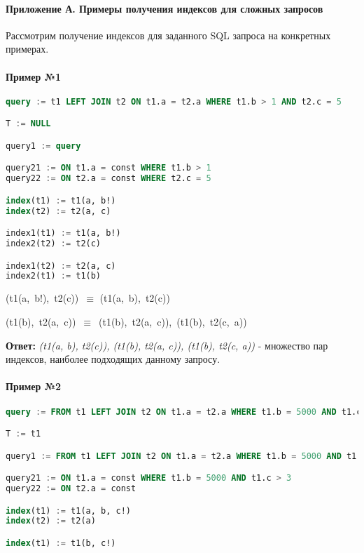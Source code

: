 \paragraph{Приложение А. Примеры получения индексов для сложных запросов}

Рассмотрим получение индексов для заданного SQL запроса на конкретных примерах.

\paragraph{Пример №1}

\begin{lstlisting}[language=SQL]
query := t1 LEFT JOIN t2 ON t1.a = t2.a WHERE t1.b > 1 AND t2.c = 5

T := NULL 

query1 := query 

query21 := ON t1.a = const WHERE t1.b > 1 
query22 := ON t2.a = const WHERE t2.c = 5

index(t1) := t1(a, b!) 
index(t2) := t2(a, c) 

index1(t1) := t1(a, b!) 
index2(t2) := t2(c) 

index1(t2) := t2(a, c) 
index2(t1) := t1(b) 
\end{lstlisting}

(t1(a, b!), t2(c)) $\equiv$ (t1(a, b), t2(c)) 

(t1(b), t2(a, c)) $\equiv$ (t1(b), t2(a, c)), (t1(b), t2(c, a)) 

\textbf{Ответ:} \textit{(t1(a, b), t2(c)), (t1(b), t2(a, c)), (t1(b), t2(c, a))} - множество пар индексов, наиболее подходящих данному запросу. 


\paragraph{Пример №2}
\begin{lstlisting}[language=SQL]
query := FROM t1 LEFT JOIN t2 ON t1.a = t2.a WHERE t1.b = 5000 AND t1.c > 3 ORDER BY t2.c, t2.d

T := t1 

query1 := FROM t1 LEFT JOIN t2 ON t1.a = t2.a WHERE t1.b = 5000 AND t1.c > 3

query21 := ON t1.a = const WHERE t1.b = 5000 AND t1.c > 3 
query22 := ON t2.a = const

index(t1) := t1(a, b, c!) 
index(t2) := t2(a) 

index(t1) := t1(b, c!) 
\end{lstlisting}
 
